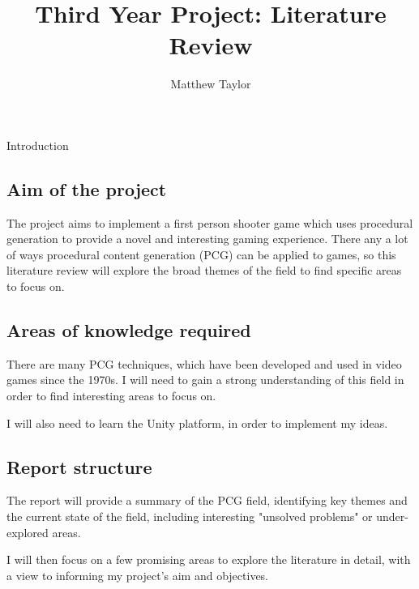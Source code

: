 \documentclass[review]{cmpreport}
\title{Third Year Project: Literature Review}
\author{Matthew Taylor}
\begin{document}
\maketitle

\begin{section}{Introduction}

\subsection{Aim of the project}
The project aims to implement a first person shooter game which uses procedural generation to provide a novel and interesting gaming experience. There any a lot of ways procedural content generation (PCG) can be applied to games, so this literature review will explore the broad themes of the field to find specific areas to focus on.

\subsection{Areas of knowledge required}
There are many PCG techniques, which have been developed and used in video games since the 1970s. I will need to gain a strong understanding of this field in order to find interesting areas to focus on. \par
I will also need to learn the Unity platform, in order to implement my ideas. 

\subsection{Report structure}
The report will provide a summary of the PCG field, identifying key themes and the current state of the field, including interesting "unsolved problems" or under-explored areas. \par
I will then focus on a few promising areas to explore the literature in detail, with a view to informing my project's aim and objectives.

\end{section}
\end{document}
